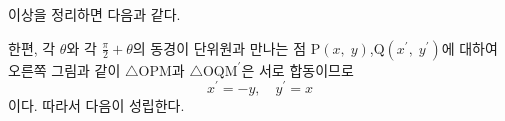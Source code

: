 \documentclass[11pt, a4paper]{book}
\begin{document}
이상을 정리하면 다음과 같다.
\vspace{1em}
\begin{theorem}
\end{theorem}

\begin{minipage}{0.6\textwidth}
	한편, 각 $\theta$와 각 $\frac{\pi}{2}+\theta$의 동경이 단위원과 만나는 점 $\textrm{P}(x,\;y)$,$\textrm{Q}(x^{\prime},\;y^{\prime})$에 대하여 오른쪽 그림과 같이 $\triangle\textrm{OPM}$과 $\triangle \textrm{OQM}^{\prime}$은 서로 합동이므로
	\[
	x^{\prime} = - y , \quad y^{\prime} =x
	\]
	이다. 따라서 다음이 성립한다.
\end{minipage}
\end{document}
